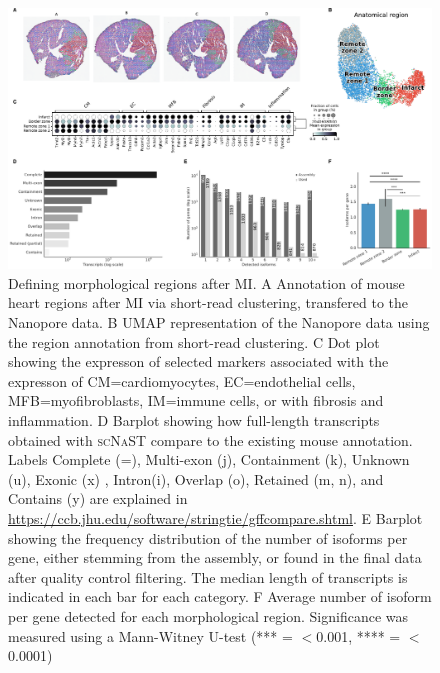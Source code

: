 \documentclass[utf8]{FrontiersinHarvard} %
\newcommand{\scnast}{\textsc{scNaST}\xspace}
\begin{document}
\begin{figure}[h!]
\begin{center}
\includegraphics[width=\textwidth]{figure2}
\end{center}
\caption{Defining morphological regions after MI. A Annotation of mouse heart regions after MI via short-read clustering, transfered to the Nanopore data. B UMAP representation of the Nanopore data using the region annotation from short-read clustering. C Dot plot showing the expresson of selected markers associated with the expresson of CM=cardiomyocytes, EC=endothelial cells, MFB=myofibroblasts, IM=immune cells, or with fibrosis and inflammation. D Barplot showing how full-length transcripts obtained with \scnast compare to the existing mouse annotation. Labels Complete (=), Multi-exon (j), Containment (k), Unknown (u), Exonic (x) , Intron(i), Overlap (o), Retained (m, n), and Contains (y) are explained in \url{https://ccb.jhu.edu/software/stringtie/gffcompare.shtml}. E Barplot showing the frequency distribution of the number of isoforms per gene, either stemming from the assembly, or found in the final data after quality control filtering. The median length of transcripts is indicated in each bar for each category. F Average number of isoform per gene detected for each morphological region. Significance was measured using a Mann-Witney U-test (*** = $<$0.001, **** = $<$0.0001)}\label{fig:2}
\end{figure}



%

\end{document}
